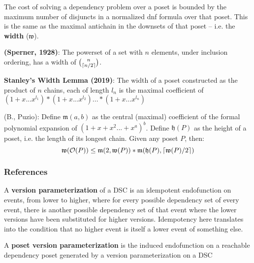\documentclass{beamer}
\newcommand{\Oc}{\mathcal{O}}
\newcommand{\Mf}{\mathfrak{m}}
\newcommand{\Wf}{\mathfrak{w}}
\newcommand{\Hf}{\mathfrak{h}}
\DeclarePairedDelimiter\ceil{\lceil}{\rceil}
\begin{document}
\begin{frame}
The cost of solving a dependency problem over a poset is bounded by the maximum number of disjuncts in a normalized dnf formula over that poset. This is the same as the maximal antichain in the downsets of that poset -- i.e. the \textbf{width} (\(\Wf\)).

\begin{theorem}
\textbf{(Sperner, 1928)}: The powerset of a set with \(n\) elements, under inclusion ordering, has a width of \(\binom{n}{\ceil{n/2}}\).
\end{theorem}
\end{frame}

\begin{frame}

\begin{lemma}
\textbf{Stanley's Width Lemma (2019)}: The width of a poset constructed as the product of \(n\) chains, each of length \(l_n\) is the maximal coefficient of \((1+x...x^{l_1})*(1+x...x^{l_2})...*(1+x...x^{l_n})\)
\end{lemma}

\begin{theorem}
(B., Puzio): Define \(\Mf(a,b)\) as the central (maximal) coefficient of the formal polynomial expansion of \((1 + x + x^2 ... + x^a)^b\). Define \(\Hf(P)\) as the height of a poset, i.e. the length of its longest chain. Given any poset \(P\), then:
\begin{equation*}
 \Wf(\Oc(P)) \le \Mf(2,\Wf(P)) * \Mf(\Hf(P),\ceil{\Wf(P)/2})
\end{equation*}
\end{theorem}
\end{frame}


\begin{frame}[allowframebreaks]
        \frametitle{References}
         \nocite{*}
        
	
\end{frame}


\begin{frame}
\begin{definition}
A \textbf{version parameterization} of a DSC is an idempotent endofunction on events, from lower to higher, where for every possible dependency set of every event, there is another possible dependency set of that event where the lower versions have been substituted for higher versions. Idempotency here translates into the condition that no higher event is itself a lower event of something else.

A \textbf{poset version parameterization} is the induced endofunction on a reachable dependency poset generated by a version parameterization on a DSC
\end{definition}

\end{frame}
\end{document}
